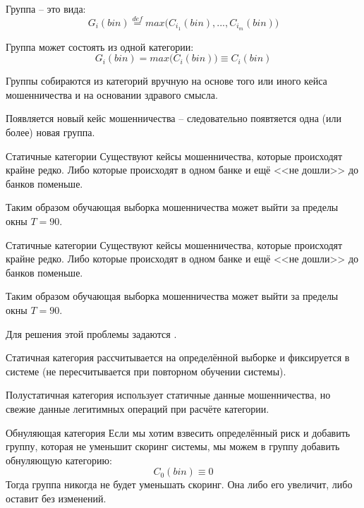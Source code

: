 \begin{frame}{Группа}
	 -- это 
	вида:
	\begin{equation}\label{eq:group}
		G_i (bin) \stackrel{def}{=} max \big( C_{i_1}(bin), ..., C_{i_m}(bin) \big)
	\end{equation}
	
	Группа может состоять из одной категории:
	\begin{equation*}
	G_i (bin) = max \big( C_{i}(bin) \big) \equiv C_{i}(bin)
	\end{equation*}
	
	Группы собираются из категорий вручную на основе того или иного кейса мошенничества
	и на основании здравого смысла.
	
	Появляется новый кейс мошенничества -- следовательно появтяется одна (или более) новая группа.
\end{frame}

\begin{frame}{Статичные категории}
	Существуют кейсы мошенничества, которые происходят крайне редко. Либо которые происходят в одном банке и ещё <<не дошли>> до банков поменьше. 
	
	Таким образом обучающая выборка мошенничества может выйти за пределы окны $T=90$. 
	
\end{frame}

\begin{frame}{Статичные категории}
	\small
	Существуют кейсы мошенничества, которые происходят крайне редко. Либо которые происходят в одном банке и ещё <<не дошли>> до банков поменьше. 
	
	Таким образом обучающая выборка мошенничества может выйти за пределы окны $T=90$. 
	
	Для решения этой проблемы задаются .
	
	Статичная категория рассчитывается на определённой выборке и фиксируется в системе 
	(не пересчитывается при повторном обучении системы).
	
	Полустатичная категория использует статичные данные мошенничества, но свежие данные
	легитимных операций при расчёте категории.
\end{frame}

\begin{frame}{Обнуляющая категория}
	Если мы хотим взвесить определённый риск и добавить группу, которая не уменьшит скоринг системы, 
	мы можем в группу добавить обнуляющую категорию:
	\begin{equation}\label{eq:zero_category}
	C_0 (bin) \equiv 0
	\end{equation}
	Тогда группа никогда не будет уменьшать скоринг. Она либо его увеличит, либо оставит без изменений.
	
	
	
\end{frame}


